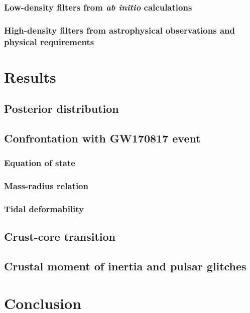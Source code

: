 \subsubsection{Low-density filters from \textit{ab initio} calculations}

\subsubsection{High-density filters from astrophysical observations and 
physical requirements}

\section{Results}

\subsection{Posterior distribution}

\subsection{Confrontation with GW170817 event}

\subsubsection{Equation of state}

\subsubsection{Mass-radius relation}

\subsubsection{Tidal deformability}

\subsection{Crust-core transition}

\subsection{Crustal moment of inertia and pulsar glitches}

\section{Conclusion}
